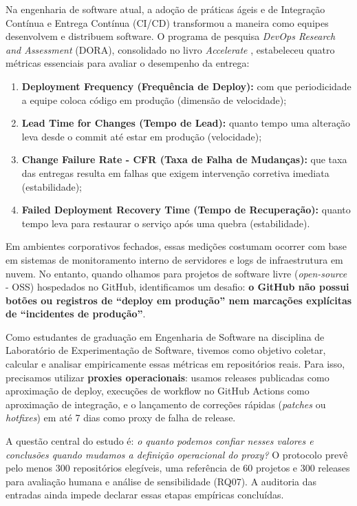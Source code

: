 \documentclass[12pt]{article}
\begin{document}
Na engenharia de software atual, a adoção de práticas ágeis e de Integração Contínua e Entrega Contínua (CI/CD) transformou a maneira como equipes desenvolvem e distribuem software. O programa de pesquisa \textit{DevOps Research and Assessment} (DORA), consolidado no livro \textit{Accelerate} \cite{forsgren2018accelerate}, estabeleceu quatro métricas essenciais para avaliar o desempenho da entrega:
\begin{enumerate}
    \item \textbf{Deployment Frequency (Frequência de Deploy):} com que periodicidade a equipe coloca código em produção (dimensão de velocidade);
    \item \textbf{Lead Time for Changes (Tempo de Lead):} quanto tempo uma alteração leva desde o commit até estar em produção (velocidade);
    \item \textbf{Change Failure Rate - CFR (Taxa de Falha de Mudanças):} que taxa das entregas resulta em falhas que exigem intervenção corretiva imediata (estabilidade);
    \item \textbf{Failed Deployment Recovery Time (Tempo de Recuperação):} quanto tempo leva para restaurar o serviço após uma quebra (estabilidade).
\end{enumerate}

Em ambientes corporativos fechados, essas medições costumam ocorrer com base em sistemas de monitoramento interno de servidores e logs de infraestrutura em nuvem. No entanto, quando olhamos para projetos de software livre (\textit{open-source} - OSS) hospedados no GitHub, identificamos um desafio: \textbf{o GitHub não possui botões ou registros de ``deploy em produção'' nem marcações explícitas de ``incidentes de produção''}. 

Como estudantes de graduação em Engenharia de Software na disciplina de Laboratório de Experimentação de Software, tivemos como objetivo coletar, calcular e analisar empiricamente essas métricas em repositórios reais. Para isso, precisamos utilizar \textbf{proxies operacionais}: usamos releases publicadas como aproximação de deploy, execuções de workflow no GitHub Actions como aproximação de integração, e o lançamento de correções rápidas (\textit{patches} ou \textit{hotfixes}) em até 7 dias como proxy de falha de release.

A questão central do estudo é: \textit{o quanto podemos confiar nesses valores e conclusões quando mudamos a definição operacional do proxy?} O protocolo prevê pelo menos 300 repositórios elegíveis, uma referência de 60 projetos e 300 releases para avaliação humana e análise de sensibilidade (RQ07). A auditoria das entradas ainda impede declarar essas etapas empíricas concluídas.
\end{document}
